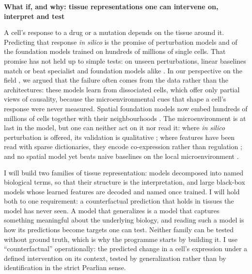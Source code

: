 \documentclass[11pt,a4paper]{article}
\newcommand{\plantitle}[1]{{\fontsize{13}{15}\bfseries #1\par}\vspace{4pt}}
\begin{document}
\plantitle{What if, and why: tissue representations one can intervene on, interpret and test}

A cell's response to a drug or a mutation depends on the tissue around it. Predicting that response \emph{in silico} is the promise of perturbation models and of the foundation models trained on hundreds of millions of single cells. That promise has not held up to simple tests: on unseen perturbations, linear baselines match or beat specialist and foundation models alike \citep{ahlmanneltze2025linear, wu2024perturbench}. In our perspective on the field \citep{dimitrov2026interpretation}, we argued that the failure often comes from the data rather than the architectures: these models learn from dissociated cells, which offer only partial views of causality, because the microenvironmental cues that shape a cell's response were never measured. Spatial foundation models now embed hundreds of millions of cells together with their neighbourhoods \citep{blampey2025novae, tejadalapuerta2025nicheformer, birk2026terra, wenckstern2026virtues}. The microenvironment is at last in the model, but one can neither act on it nor read it: where \emph{in silico} perturbation is offered, its validation is qualitative \citep{birk2026terra}; where features have been read with sparse dictionaries, they encode co-expression rather than regulation \citep{kendiukhov2026atlas}; and no spatial model yet beats naive baselines on the local microenvironment \citep{handa2026saffron}.

I will build two families of tissue representation: models decomposed into named biological terms, so that their structure is the interpretation, and large black-box models whose learned features are decoded and named once trained. I will hold both to one requirement: a counterfactual prediction that holds in tissues the model has never seen. A model that generalizes is a model that captures something meaningful about the underlying biology, and reading such a model is how its predictions become targets one can test. Neither family can be tested without ground truth, which is why the programme starts by building it. I use ``counterfactual'' operationally: the predicted change in a cell's expression under a defined intervention on its context, tested by generalization rather than by identification in the strict Pearlian sense.
\end{document}
